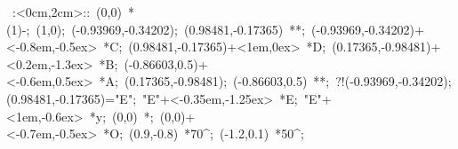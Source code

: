 %


\hbox{
\xy    <2cm,0cm>:<0cm,2cm>::
       (0,0) *\ellipse(1){-}; (1,0); 
       (-0.93969,-0.34202); (0.98481,-0.17365) **\dir{-}; 
       (-0.93969,-0.34202)+<-0.8em,-0.5ex> *{C}; 
       (0.98481,-0.17365)+<1em,0ex> *{D}; 
       (0.17365,-0.98481)+<0.2em,-1.3ex> *{B}; 
       (-0.86603,0.5)+<-0.6em,0.5ex> *{A}; 
       (0.17365,-0.98481); (-0.86603,0.5) **\dir{-};
  ?!{(-0.93969,-0.34202);(0.98481,-0.17365)}="E"; "E"+<-0.35em,-1.25ex> 
                  *{E}; "E"+<1em,-0.6ex> *{y};
       (0,0) *{\bullet}; (0,0)+<-0.7em,-0.5ex> *{O};
       (0.9,-0.8) *{70^\circ};  (-1.2,0.1) *{50^\circ};
\endxy}



